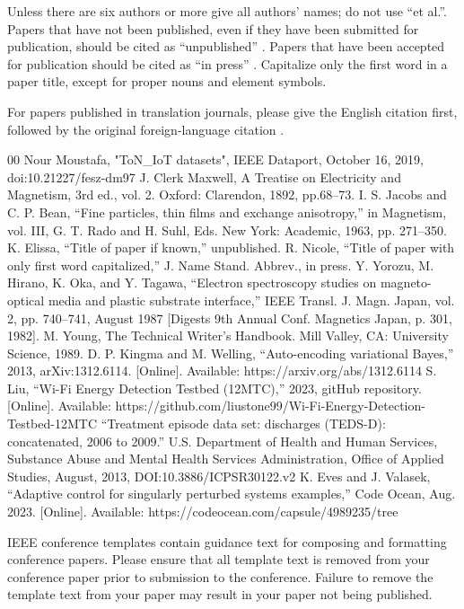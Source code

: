 \documentclass[conference]{IEEEtran}
\begin{document}
Unless there are six authors or more give all authors' names; do not use 
``et al.''. Papers that have not been published, even if they have been 
submitted for publication, should be cited as ``unpublished'' \cite{b4}. Papers 
that have been accepted for publication should be cited as ``in press'' \cite{b5}. 
Capitalize only the first word in a paper title, except for proper nouns and 
element symbols.

For papers published in translation journals, please give the English 
citation first, followed by the original foreign-language citation \cite{b6}.

\begin{thebibliography}{00}
 Nour Moustafa, "ToN_IoT datasets", IEEE Dataport, October 16, 2019, doi:10.21227/fesz-dm97
 J. Clerk Maxwell, A Treatise on Electricity and Magnetism, 3rd ed., vol. 2. Oxford: Clarendon, 1892, pp.68--73.
 I. S. Jacobs and C. P. Bean, ``Fine particles, thin films and exchange anisotropy,'' in Magnetism, vol. III, G. T. Rado and H. Suhl, Eds. New York: Academic, 1963, pp. 271--350.
 K. Elissa, ``Title of paper if known,'' unpublished.
 R. Nicole, ``Title of paper with only first word capitalized,'' J. Name Stand. Abbrev., in press.
 Y. Yorozu, M. Hirano, K. Oka, and Y. Tagawa, ``Electron spectroscopy studies on magneto-optical media and plastic substrate interface,'' IEEE Transl. J. Magn. Japan, vol. 2, pp. 740--741, August 1987 [Digests 9th Annual Conf. Magnetics Japan, p. 301, 1982].
 M. Young, The Technical Writer's Handbook. Mill Valley, CA: University Science, 1989.
 D. P. Kingma and M. Welling, ``Auto-encoding variational Bayes,'' 2013, arXiv:1312.6114. [Online]. Available: https://arxiv.org/abs/1312.6114
 S. Liu, ``Wi-Fi Energy Detection Testbed (12MTC),'' 2023, gitHub repository. [Online]. Available: https://github.com/liustone99/Wi-Fi-Energy-Detection-Testbed-12MTC
 ``Treatment episode data set: discharges (TEDS-D): concatenated, 2006 to 2009.'' U.S. Department of Health and Human Services, Substance Abuse and Mental Health Services Administration, Office of Applied Studies, August, 2013, DOI:10.3886/ICPSR30122.v2
 K. Eves and J. Valasek, ``Adaptive control for singularly perturbed systems examples,'' Code Ocean, Aug. 2023. [Online]. Available: https://codeocean.com/capsule/4989235/tree
\end{thebibliography}

\vspace{12pt}
\color{red}
IEEE conference templates contain guidance text for composing and formatting conference papers. Please ensure that all template text is removed from your conference paper prior to submission to the conference. Failure to remove the template text from your paper may result in your paper not being published.
\end{document}
